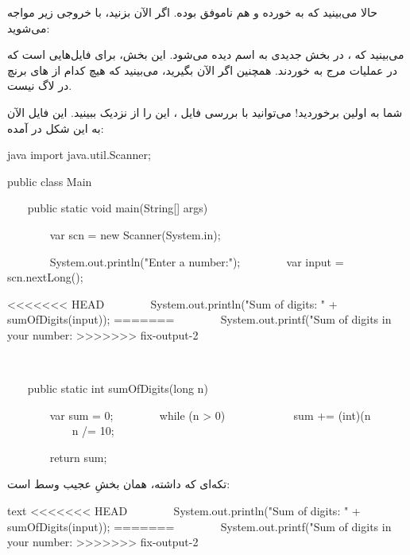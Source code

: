 حالا می‌بینید که  به  خورده و  هم
ناموفق بوده. اگر الآن  بزنید، با خروجی زیر مواجه
می‌شوید:


می‌بینید که  ، در بخش جدیدی به اسم
 دیده می‌شود. این بخش، برای فایل‌هایی است که در عملیات
مرج به  خوردند. همچنین اگر الآن 
بگیرید، می‌بینید که هیچ کدام از  های برنچ
 در لاگ نیست.

شما به اولین  برخوردید! می‌توانید با بررسی فایل
، این  را از نزدیک ببینید. این فایل
الآن به این شکل در آمده:

\begin{codebox}{java}
import java.util.Scanner;

public class Main {
    public static void main(String[] args) {
        var scn = new Scanner(System.in);  
  
        System.out.println("Enter a number:");
        var input = scn.nextLong(); 
        
 <<<<<<< HEAD
        System.out.println("Sum of digits: " + sumOfDigits(input));  
=======  
        System.out.printf("Sum of digits in your number: %
 >>>>>>> fix-output-2 

    }

    public static int sumOfDigits(long n) {
        var sum = 0;
        while (n > 0) {  
            sum += (int)(n %
            n /= 10;  
        }

        return sum;  
    }  
}
\end{codebox}

تکه‌ای که  داشته، همان بخشِ عجیب وسط است:

\begin{codebox}{text}
 <<<<<<< HEAD  
        System.out.println("Sum of digits: " + sumOfDigits(input));  
=======  
        System.out.printf("Sum of digits in your number: %
 >>>>>>> fix-output-2

\end{codebox}

